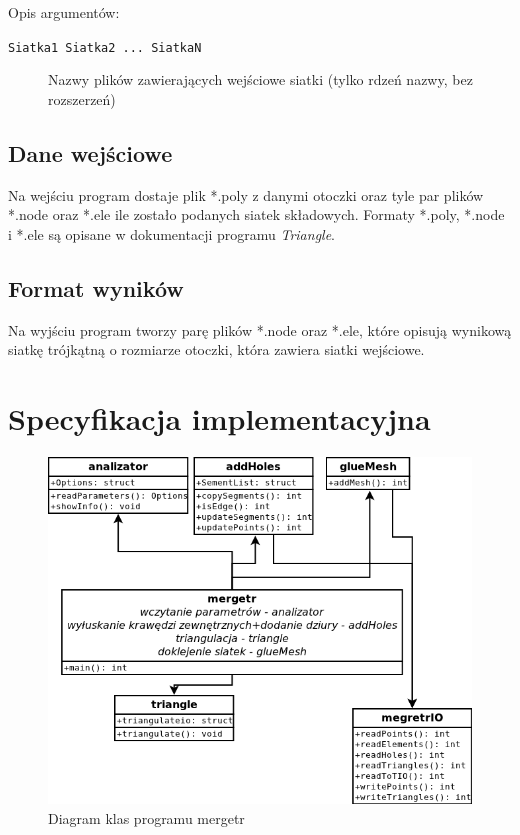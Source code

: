 \documentclass[a4paper,12pt,twoside]{article}
\newcommand{\prog}{\texttt}
\begin{document}
Opis argumentów:
\begin{description}
\item[\prog{Siatka1 Siatka2 ... SiatkaN}] Nazwy plików zawierających wejściowe siatki (tylko rdzeń nazwy, bez rozszerzeń)
\end{description}


\subsection{Dane wejściowe}

Na wejściu program dostaje plik *.poly z danymi otoczki oraz tyle par plików *.node oraz *.ele ile zostało podanych siatek składowych. Formaty *.poly, *.node i *.ele są opisane w dokumentacji programu \emph{Triangle}.


\subsection{Format wyników}

Na wyjściu program tworzy parę plików *.node oraz *.ele, które opisują wynikową siatkę trójkątną o rozmiarze otoczki, która zawiera siatki wejściowe.

\section{Specyfikacja implementacyjna}

\begin{figure}
\includegraphics[scale=0.7]{img/diagram.png}
\caption{Diagram klas programu mergetr}
\end{figure}
\end{document}
